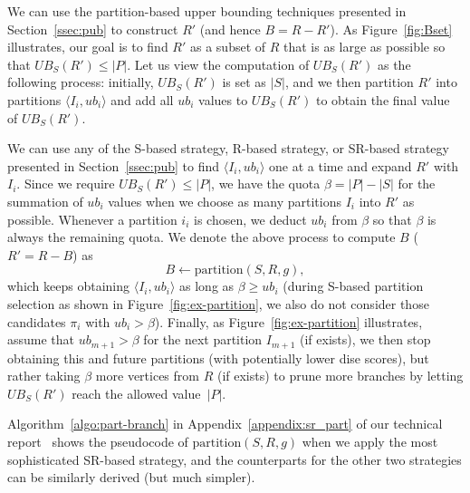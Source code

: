 \documentclass[sigconf, nonacm]{acmart}
\begin{document}
We can use the partition-based upper bounding techniques presented in Section~\ref{ssec:pub} to construct $R'$ (and hence $B=R-R'$). As Figure~\ref{fig:Bset} illustrates, our goal is to find $R'$ as a subset of $R$ that is as large as possible so that $UB_S(R')\leq |P|$. Let us view the computation of $UB_S(R')$ as the following process: initially, $UB_S(R')$ is set as $|S|$, and we then partition $R'$ into partitions $\langle I_i, ub_i\rangle$ and add all $ub_i$ values to $UB_S(R')$ to obtain the final value of $UB_S(R')$.

We can use any of the S-based strategy, R-based strategy, or SR-based strategy presented in Section~\ref{ssec:pub} to find $\langle I_i, ub_i\rangle$ one at a time and expand $R'$ with $I_i$. Since we require $UB_S(R')\leq |P|$, we have the quota $\beta=|P|-|S|$ for the summation of $ub_i$ values when we choose as many partitions $I_i$ into $R'$ as possible. Whenever a partition $i_i$ is chosen, we deduct $ub_i$
 from $\beta$ so that $\beta$ is always the remaining quota. We denote the above process to compute $B$ ($R'=R-B$) as
 \vspace{-1mm}
$$B\gets\text{partition}(S, R, g),$$
which keeps obtaining $\langle I_i, ub_i\rangle$ as long as $\beta\geq ub_i$ (during S-based partition selection as shown in Figure~\ref{fig:ex-partition}, we also do not consider those candidates $\pi_i$ with $ub_i>\beta$). Finally, as Figure~\ref{fig:ex-partition} illustrates, assume that $ub_{m+1}>\beta$ for the next partition $I_{m+1}$ (if exists), we then stop obtaining this and future partitions (with potentially lower dise scores), but rather taking $\beta$ more vertices from $R$ (if exists) to prune more branches by letting $UB_S(R')$ reach the allowed value~$|P|$.

Algorithm~\ref{algo:part-branch} in Appendix~\ref{appendix:sr_part} of our technical report~\cite{tech_report} shows the pseudocode of $\text{partition}(S, R, g)$ when we apply the most sophisticated SR-based strategy, and the counterparts for the other two strategies can be similarly derived (but much simpler).
\end{document}
